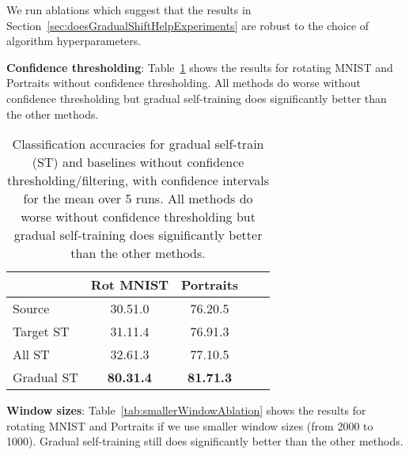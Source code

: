 \documentclass[11pt]{article}
\begin{document}
We run ablations which suggest that the results in Section~\ref{sec:doesGradualShiftHelpExperiments} are robust to the choice of algorithm hyperparameters.

\textbf{Confidence thresholding}: Table~\ref{tab:confAblation} shows the results for rotating MNIST and Portraits without confidence thresholding. All methods do worse without confidence thresholding but gradual self-training does significantly better than the other methods.

\begin{table}[t]
\caption{
Classification accuracies for gradual self-train (ST) and baselines without confidence thresholding/filtering, with  confidence intervals for the mean over 5 runs. All methods do worse without confidence thresholding but gradual self-training does significantly better than the other methods.
}
\label{tab:confAblation}
\vskip 0.15in
\begin{center}
\begin{small}
\begin{sc}
\begin{tabular}{lcccr}
\toprule
 & Rot MNIST & Portraits \\
\midrule
Source      & 30.51.0 & 76.20.5 \\
Target ST   & 31.11.4 & 76.91.3 \\
All ST      & 32.61.3 & 77.10.5 \\
Gradual ST  & \textbf{80.31.4} & \textbf{81.71.3} \\
\bottomrule
\end{tabular}
\end{sc}
\end{small}
\end{center}
\vskip -0.1in
\end{table}

\textbf{Window sizes}: Table~\ref{tab:smallerWindowAblation} shows the results for rotating MNIST and Portraits if we use smaller window sizes (from 2000 to 1000). Gradual self-training still does significantly better than the other methods.
\end{document}
